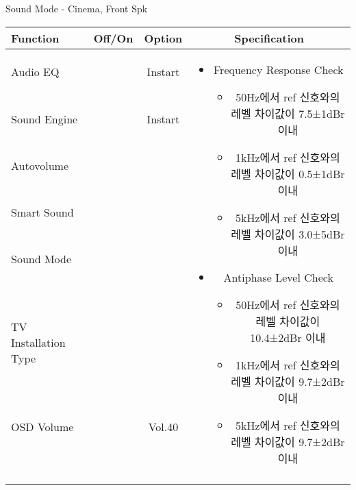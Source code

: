 \begin{frame}[t]{Sound Mode - Cinema, Front Spk}
\begin{tiny}
\begin{tabular}{@{}lccc@{}}
\toprule
Function & Off/On & Option & Specification \\
\midrule
Audio EQ & \color{black}{Off} & Instart &
\multirow{10}{60mm}{
\begin{itemize}
\item Frequency Response Check
	\begin{itemize}
	\item 50Hz에서 ref 신호와의 레벨 차이값이 7.5±1dBr 이내
	\item 1kHz에서 ref 신호와의 레벨 차이값이 0.5±1dBr 이내	
	\item 5kHz에서 ref 신호와의 레벨 차이값이 3.0±5dBr 이내
	\end{itemize}
\item Antiphase Level Check
	\begin{itemize}
	\item 50Hz에서 ref 신호와의 레벨 차이값이 10.4±2dBr 이내
	\item 1kHz에서 ref 신호와의 레벨 차이값이 9.7±2dBr 이내
	\item 5kHz에서 ref 신호와의 레벨 차이값이 9.7±2dBr 이내
	\end{itemize}
\end{itemize}
} \\
Sound Engine & \color{blue}{On} & Instart & \\
Autovolume & \color{black}{Off} & & \\
Smart Sound & \color{black}{Off} & & \\
Sound Mode & \color{blue}{On} & \color{blue}{Cinema} & \\
TV Installation Type & \color{blue}{On} & \color{black}{Standtype1} & \\
OSD Volume & \color{blue}{On} & Vol.40 & \\
& & & \\
& & & \\
& & & \\
& & & \\
\midrule
\end{tabular}
\end{tiny}


\end{frame}



